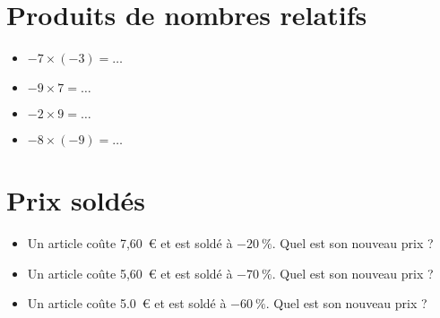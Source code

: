 \documentclass[a4paper,11pt,fleqn]{article}
\begin{document}
\section{Produits de nombres relatifs}
\begin{itemize}

  \item $-7\times(-3)=\ldots$
  \item $-9\times7=\ldots$
  \item $-2\times9=\ldots$
  \item $-8\times(-9)=\ldots$
\end{itemize}


\section{Prix soldés}
\begin{itemize}

  \item Un article coûte 7,60~€ et est soldé à $-20~\%$. Quel est son nouveau prix ?
  \item Un article coûte 5,60~€ et est soldé à $-70~\%$. Quel est son nouveau prix ?
  \item Un article coûte 5.0~€ et est soldé à $-60~\%$. Quel est son nouveau prix ?
\end{itemize}
\end{document}
